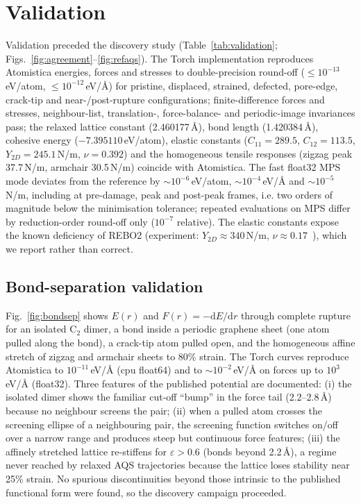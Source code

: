 \section{Validation}
\label{sec:validation}
Validation preceded the discovery study (Table~\ref{tab:validation}; Figs.~\ref{fig:agreement}--\ref{fig:refaqs}). The Torch implementation reproduces Atomistica energies, forces and stresses to double-precision round-off ($\le 10^{-13}$\,eV/atom, $\le 10^{-12}$\,eV/\AA) for pristine, displaced, strained, defected, pore-edge, crack-tip and near-/post-rupture configurations; finite-difference forces and stresses, neighbour-list, translation-, force-balance- and periodic-image invariances pass; the relaxed lattice constant (2.460177\,\AA), bond length (1.420384\,\AA), cohesive energy ($-7.395110$\,eV/atom), elastic constants ($C_{11}=289.5$, $C_{12}=113.5$, $Y_{2D}=245.1$\,N/m, $\nu=0.392$) and the homogeneous tensile responses (zigzag peak 37.7\,N/m, armchair 30.5\,N/m) coincide with Atomistica. The fast float32 MPS mode deviates from the reference by $\sim10^{-6}$\,eV/atom, $\sim10^{-4}$\,eV/\AA{} and $\sim10^{-5}$\,N/m, including at pre-damage, peak and post-peak frames, i.e. two orders of magnitude below the minimisation tolerance; repeated evaluations on MPS differ by reduction-order round-off only ($10^{-7}$ relative). The elastic constants expose the known deficiency of REBO2 (experiment: $Y_{2D}\approx340$\,N/m, $\nu\approx0.17$~\cite{lee2008}), which we report rather than correct.

\subsection{Bond-separation validation}
\label{sec:bondsep}
Fig.~\ref{fig:bondsep} shows $E(r)$ and $F(r)=-\mathrm dE/\mathrm dr$ through complete rupture for an isolated C$_2$ dimer, a bond inside a periodic graphene sheet (one atom pulled along the bond), a crack-tip atom pulled open, and the homogeneous affine stretch of zigzag and armchair sheets to 80\% strain. The Torch curves reproduce Atomistica to $10^{-11}$\,eV/\AA{} (cpu float64) and to $\sim10^{-2}$\,eV/\AA{} on forces up to $10^3$\,eV/\AA{} (float32). Three features of the published potential are documented: (i) the isolated dimer shows the familiar cut-off ``bump'' in the force tail (2.2--2.8\,\AA) because no neighbour screens the pair; (ii) when a pulled atom crosses the screening ellipse of a neighbouring pair, the screening function switches on/off over a narrow range and produces steep but continuous force features; (iii) the affinely stretched lattice re-stiffens for $\varepsilon>0.6$ (bonds beyond 2.2\,\AA), a regime never reached by relaxed AQS trajectories because the lattice loses stability near 25\% strain. No spurious discontinuities beyond those intrinsic to the published functional form were found, so the discovery campaign proceeded.

